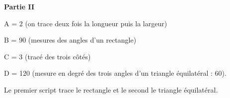 \documentclass[10pt]{article}
\begin{document}
\textbf{Partie II}

A = 2 (on trace deux fois la longueur puis la largeur)

B = 90 (mesures des  angles d'un rectangle)

C = 3 (tracé des trois côtés)

D = 120 (mesure en degré des trois angles d'un triangle équilatéral : 60).

Le premier script trace le rectangle et le second le triangle équilatéral.

\vspace{0,5cm}
\end{document}
